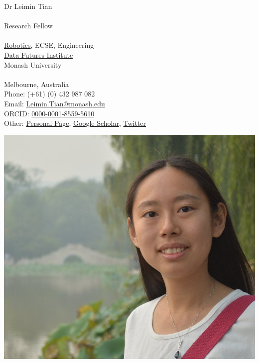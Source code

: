 \documentclass[11pt,letterpaper]{article}
\begin{document}

\begin{minipage}[b]{0.55\textwidth}
  {\huge Dr Leimin Tian \\}
  \\
  {\large Research Fellow \\}
  \\
  \href{https://www.monash.edu/engineering/robotics}{Robotics}, ECSE, Engineering \\
  \href{https://www.monash.edu/data-futures-institute}{Data Futures Institute} \\
  Monash University \\
  \\
  Melbourne, Australia \\
  Phone: (+61) (0) 432 987 082 \\
  Email: \href{mailto:Leimin.Tian@monash.edu}{Leimin.Tian@monash.edu} \\
  ORCID: \href{https://orcid.org/0000-0001-8559-5610}{0000-0001-8559-5610}\\
  Other: \href{https://tianleimin.github.io/}{Personal Page}, \href{https://scholar.google.com/citations?hl=en&user=d-PQpWgAAAAJ&view_op=list_works&sortby=pubdate}{Google Scholar}, \href{https://twitter.com/LeiminTian}{Twitter}
\end{minipage}
\hfill
\begin{minipage}[b]{0.4\textwidth}
  \includegraphics[width=\textwidth]{LeiminTian}
\end{minipage}
\end{document}
